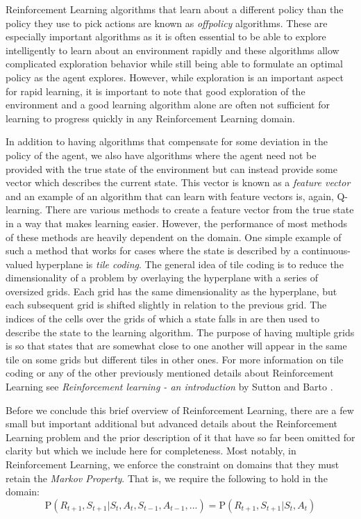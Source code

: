\documentclass[../main.tex]{subfiles}
\begin{document}
Reinforcement Learning algorithms that learn about a different policy than the policy they use to pick actions are known as \textit{offpolicy} algorithms. These are especially important algorithms as it is often essential to be able to explore intelligently to learn about an environment rapidly and these algorithms allow complicated exploration behavior while still being able to formulate an optimal policy as the agent explores. However, while exploration is an important aspect for rapid learning, it is important to note that good exploration of the environment and a good learning algorithm alone are often not sufficient for learning to progress quickly in any Reinforcement Learning domain.

In addition to having algorithms that compensate for some deviation in the policy of the agent, we also have algorithms where the agent need not be provided with the true state of the environment but can instead provide some vector which describes the current state. This vector is known as a \textit{feature vector} and an example of an algorithm that can learn with feature vectors is, again, Q-learning. There are various methods to create a feature vector from the true state in a way that makes learning easier. However, the performance of most methods of these methods are heavily dependent on the domain. One simple example of such a method that works for cases where the state is described by a continuous-valued hyperplane is \textit{tile coding}. The general idea of tile coding is to reduce the dimensionality of a problem by overlaying the hyperplane with a series of oversized grids. Each grid has the same dimensionality as the hyperplane, but each subsequent grid is shifted slightly in relation to the previous grid. The indices of the cells over the grids of which a state falls in are then used to describe the state to the learning algorithm. The purpose of having multiple grids is so that states that are somewhat close to one another will appear in the same tile on some grids but different tiles in other ones. For more information on tile coding or any of the other previously mentioned details about Reinforcement Learning see \textit{Reinforcement learning - an introduction} by Sutton and Barto \cite{DBLP:books/lib/SuttonB98}.

Before we conclude this brief overview of Reinforcement Learning, there are a few small but important additional but advanced details about the Reinforcement Learning problem and the prior description of it that have so far been omitted for clarity but which we include here for completeness. Most notably, in Reinforcement Learning, we enforce the constraint on domains that they must retain the \textit{Markov Property}. That is, we require the following to hold in the domain:
\begin{equation}
    \label{eqn:markov_property}
    \text{P}\left(R_{t + 1}, S_{t + 1} | S_t, A_t, S_{t - 1}, A_{t - 1}, ...\right) = \text{P}\left(R_{t + 1}, S_{t + 1} | S_t, A_t\right)
\end{equation}
\end{document}

